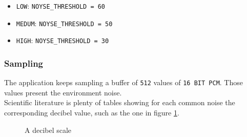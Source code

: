 \documentclass[conference]{IEEEtran}
\begin{document}
\begin{itemize}
	\item \texttt{LOW}: \texttt{NOYSE\_THRESHOLD = 60}
	\item \texttt{MEDUM}:  \texttt{NOYSE\_THRESHOLD = 50}
	\item \texttt{HIGH}:  \texttt{NOYSE\_THRESHOLD = 30}
\end{itemize}

\subsubsection{\textbf{Sampling}}
The application keeps sampling a buffer of \texttt{512} values of \texttt{16 BIT PCM}. Those values present the environment noise.\\ Scientific literature is plenty of tables showing for each common noise the corresponding decibel value, such as the one in figure \ref{img:decibels}. 

\begin{figure}[!ht]
\begin{center}
\caption{A decibel scale}
\label{img:decibels}
\end{center}
\end{figure}
\end{document}
